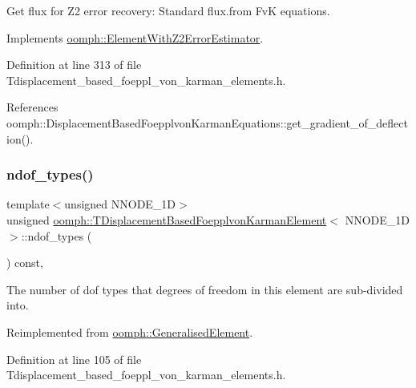 Get \textquotesingle{}flux\textquotesingle{} for Z2 error recovery\+: Standard flux.\+from FvK equations. 



Implements \hyperlink{classoomph_1_1ElementWithZ2ErrorEstimator_a5688ff5f546d81771cabad82ca5a7556}{oomph\+::\+Element\+With\+Z2\+Error\+Estimator}.



Definition at line 313 of file Tdisplacement\+\_\+based\+\_\+foeppl\+\_\+von\+\_\+karman\+\_\+elements.\+h.



References oomph\+::\+Displacement\+Based\+Foepplvon\+Karman\+Equations\+::get\+\_\+gradient\+\_\+of\+\_\+deflection().

\mbox{\label{classoomph_1_1TDisplacementBasedFoepplvonKarmanElement_a860284d46ca7b85c519464ec2a6666ec}} 
\subsubsection{\texorpdfstring{ndof\+\_\+types()}{ndof\_types()}}
{\footnotesize\ttfamily template$<$unsigned N\+N\+O\+D\+E\+\_\+1D$>$ \\
unsigned \hyperlink{classoomph_1_1TDisplacementBasedFoepplvonKarmanElement}{oomph\+::\+T\+Displacement\+Based\+Foepplvon\+Karman\+Element}$<$ N\+N\+O\+D\+E\+\_\+1D $>$\+::ndof\+\_\+types (\begin{DoxyParamCaption}{ }\end{DoxyParamCaption}) const\hspace{0.3cm}{\ttfamily [inline]}, {\ttfamily [virtual]}}



The number of dof types that degrees of freedom in this element are sub-\/divided into. 



Reimplemented from \hyperlink{classoomph_1_1GeneralisedElement_a0c6037a870597b35dcf1c780710b9a56}{oomph\+::\+Generalised\+Element}.



Definition at line 105 of file Tdisplacement\+\_\+based\+\_\+foeppl\+\_\+von\+\_\+karman\+\_\+elements.\+h.

